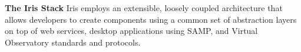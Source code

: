 \textbf{\label{fig:fig1} The Iris Stack} Iris employs an extensible, loosely coupled architecture that allows developers to create components using a common set of abstraction layers on top of web services, desktop applications using SAMP, and Virtual Observatory standards and protocols.